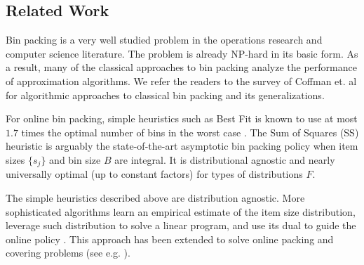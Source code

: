\documentclass{article}
\begin{document}
\subsection{Related Work}
Bin packing is a very well studied problem in the operations research and computer science literature. 
The problem is already NP-hard in its basic form. As a result, many of the classical approaches to bin packing analyze the performance of approximation algorithms. We refer the readers to the survey of Coffman et. al \cite{Coffmanetal2013} for algorithmic approaches to classical bin packing and its generalizations.   

For online bin packing, simple heuristics such as Best Fit is known to use at most $1.7$ times the optimal number of bins in the worst case \cite{Johnsonetal1974}. 
The Sum of Squares (SS) heuristic \cite{csirik2006sum} is arguably the state-of-the-art asymptotic bin packing policy when item sizes $\{s_j\}$ and bin size $B$ are integral. It is distributional agnostic and nearly universally optimal (up to constant factors) for types of distributions $F$. %

The simple heuristics described above are distribution agnostic. More sophisticated algorithms learn an empirical estimate of the item size distribution, leverage such distribution to solve a linear program, and use its dual to guide the online policy \cite{AdelmanNem1999}\cite{RheeTalagrand1993}\cite{IyengarSigman2004}. This approach has been extended to solve online packing and covering problems (see e.g. \cite{GuptaMolinaro2014}\cite{AgrawalDevanur2015}).
\end{document}
